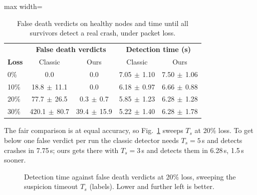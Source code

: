 \documentclass[sigconf,nonacm]{acmart}
\newcommand{\win}[1]{\textcolor{win}{#1}}
\newcommand{\tie}[1]{\textcolor{tie}{#1}}
\newcommand{\loss}[1]{\textcolor{loss}{#1}}
\newcommand{\pmsd}[2]{#1{\scriptsize$\,\pm\,$#2}}
\begin{document}
\begin{table}[h]
\caption{False death verdicts on healthy nodes and time until all survivors detect a real crash, under packet loss.}
\label{tab:loss}
\small
\begin{adjustbox}{max width=\columnwidth}
\begin{tabular}{lcccc}
\toprule
 & \multicolumn{2}{c}{\textbf{False death verdicts}} & \multicolumn{2}{c}{\textbf{Detection time (s)}} \\
\textbf{Loss} & Classic & Ours & Classic & Ours \\
\midrule
0\%  & 0.0 & \tie{0.0} & \pmsd{7.05}{1.10} & \loss{\pmsd{7.50}{1.06}} \\
10\% & \pmsd{18.8}{11.1} & \win{0.0} & \pmsd{6.18}{0.97} & \loss{\pmsd{6.66}{0.88}} \\
20\% & \pmsd{77.7}{26.5} & \win{\pmsd{0.3}{0.7}} & \pmsd{5.85}{1.23} & \loss{\pmsd{6.28}{1.28}} \\
30\% & \pmsd{420.1}{80.7} & \win{\pmsd{39.4}{15.9}} & \pmsd{5.22}{1.40} & \loss{\pmsd{6.28}{1.78}} \\
\bottomrule
\end{tabular}
\end{adjustbox}
\end{table}

The fair comparison is at equal accuracy, so Fig.~\ref{fig:tradeoff} sweeps $T_s$ at 20\% loss. To get below one false verdict per run the classic detector needs $T_s = 5$\,s and detects crashes in 7.75\,s; ours gets there with $T_s = 3$\,s and detects them in 6.28\,s, 1.5\,s sooner.

\begin{figure}[h]
\centering
{}
\caption{Detection time against false death verdicts at 20\% loss, sweeping the suspicion timeout $T_s$ (labels). Lower and further left is better.}
\label{fig:tradeoff}
\end{figure}
\end{document}

